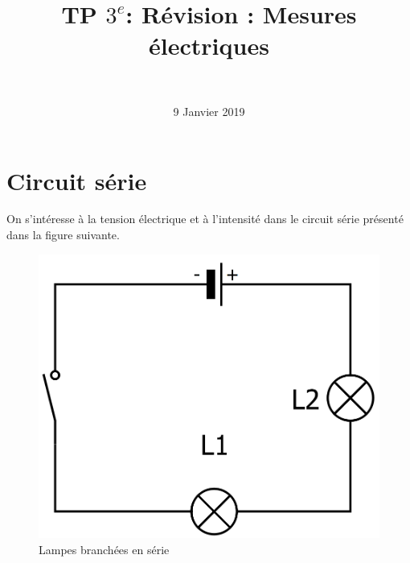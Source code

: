 \documentclass[a4paper,11pt]{exam}
\author{\ }
\date{9 Janvier 2019}
\title{TP $3^e$: Révision : Mesures électriques}
\begin{document}
	\maketitle

\section{Circuit série}\label{part:serie}

On s'intéresse à la tension électrique et à l'intensité dans le circuit série présenté dans la figure suivante.

\begin{figure}[h!]
	\begin{center}
		\includegraphics[scale=0.18]{img/serie}
	\end{center}
	\label{fig:serie}
	\caption{Lampes branchées en série}
\end{figure}
\end{document}
